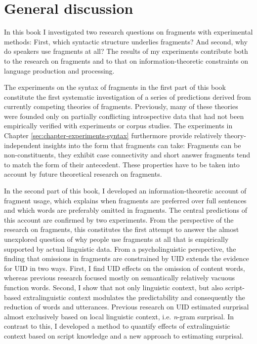 \chapter{General discussion} \label{sec:chapter-discussion}

In this book I investigated two research questions on fragments with experimental methods: First, which syntactic structure underlies fragments? And second, why do speakers use fragments at all? The results of my experiments contribute both to the research on fragments and to that on information-theoretic constraints on language production and processing.

The experiments on the syntax of fragments in the first part of this book constitute the first systematic investigation of a series of predictions derived from currently competing theories of fragments. Previously, many of these theories were founded only on partially conflicting introspective data that had not been empirically verified with experiments or corpus studies. The experiments in Chapter \ref{sec:chapter-experiments-syntax} furthermore provide relatively theory-independent insights into the form that fragments can take: Fragments can be non-constituents, they exhibit case connectivity and short answer fragments tend to match the form of their antecedent. These properties have to be taken into account by future theoretical research on fragments.

In the second part of this book, I developed an information-theoretic account of fragment usage, which explains when fragments are preferred over full sentences and which words are preferably omitted in fragments. The central predictions of this account are confirmed by two experiments. From the perspective of the research on fragments, this constitutes the first attempt to answer the almost unexplored question of why people use fragments at all that is empirically supported by actual linguistic data. From a psycholinguistic perspective, the finding that omissions in fragments are constrained by UID extends the evidence for UID in two ways. First, I find UID effects on the omission of content words, whereas previous research focused mostly on semantically relatively vacuous function words. Second, I show that not only linguistic context, but also script-based extralinguistic context modulates the predictability and consequently the reduction of words and utterances. Previous research on UID estimated surprisal almost exclusively based on local linguistic context, i.e. \textit{n}-gram surprisal. In contrast to this, I developed a method to quantify effects of extralinguistic context based on script knowledge and a new approach to estimating surprisal.

